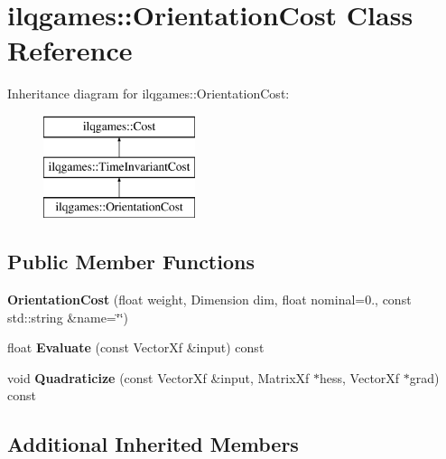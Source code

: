 \hypertarget{classilqgames_1_1_orientation_cost}{}\section{ilqgames\+:\+:Orientation\+Cost Class Reference}
\label{classilqgames_1_1_orientation_cost}
Inheritance diagram for ilqgames\+:\+:Orientation\+Cost\+:\begin{figure}[H]
\begin{center}
\leavevmode
\includegraphics[height=3.000000cm]{classilqgames_1_1_orientation_cost}
\end{center}
\end{figure}
\subsection*{Public Member Functions}
\begin{DoxyCompactItemize}
\item 
{\bfseries Orientation\+Cost} (float weight, Dimension dim, float nominal=0., const std\+::string \&name=\char`\"{}\char`\"{})\hypertarget{classilqgames_1_1_orientation_cost_a9a63ce77337909590ea8fcfe164145f7}{}\label{classilqgames_1_1_orientation_cost_a9a63ce77337909590ea8fcfe164145f7}

\item 
float {\bfseries Evaluate} (const Vector\+Xf \&input) const \hypertarget{classilqgames_1_1_orientation_cost_a8003d9ccc4642698d6782901396b68d8}{}\label{classilqgames_1_1_orientation_cost_a8003d9ccc4642698d6782901396b68d8}

\item 
void {\bfseries Quadraticize} (const Vector\+Xf \&input, Matrix\+Xf $\ast$hess, Vector\+Xf $\ast$grad) const \hypertarget{classilqgames_1_1_orientation_cost_a1865ba5ee634d5dcfa52e937dcda21fd}{}\label{classilqgames_1_1_orientation_cost_a1865ba5ee634d5dcfa52e937dcda21fd}

\end{DoxyCompactItemize}
\subsection*{Additional Inherited Members}


